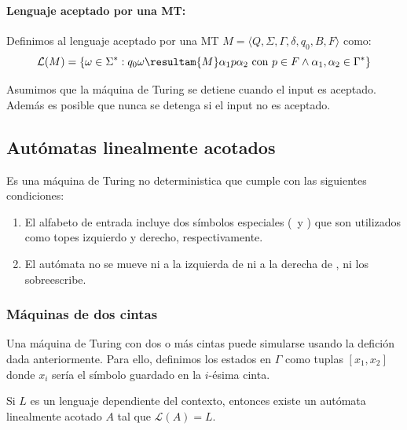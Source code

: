 \paragraph{Lenguaje aceptado por una MT:} Definimos al lenguaje aceptado por una MT \(M=\langle Q, \Sigma, \Gamma, \delta, q_0, B, F \rangle\) como:
\[
  \mathcal{L}(M) = \{ \omega \in \Sigma^*  : q_0\omega \resultam{M} \alpha_1 p\alpha_2 \text{ con } p\in F \land \alpha_1,\alpha_2\in\Gamma^* \}
\]

Asumimos que la máquina de Turing se detiene cuando el input es aceptado. Además es posible que nunca se detenga si el input no es aceptado.

\subsection{Autómatas linealmente acotados}
Es una máquina de Turing  no deterministica que cumple con las siguientes condiciones:
\begin{enumerate}
  \item El alfabeto de entrada incluye dos símbolos especiales (\textcentoldstyle~y \textdollar) que son utilizados como topes izquierdo y derecho, respectivamente.
  \item El autómata no se mueve ni a la izquierda de \textcentoldstyle ni a la derecha de \textdollar, ni los sobreescribe.
\end{enumerate}

\subsubsection{Máquinas de dos cintas}
Una máquina de Turing con dos o más cintas puede simularse usando la defición dada anteriormente. Para ello, definimos los estados en \(\Gamma\) como tuplas \([x_1, x_2]\) donde \(x_i\) sería el símbolo guardado en la \(i\)-ésima cinta.


\begin{teorema}
  Si \(L\) es un lenguaje dependiente del contexto, entonces existe un autómata linealmente acotado \(A\) tal que \(\mathcal{L}(A) = L\).
\end{teorema}

